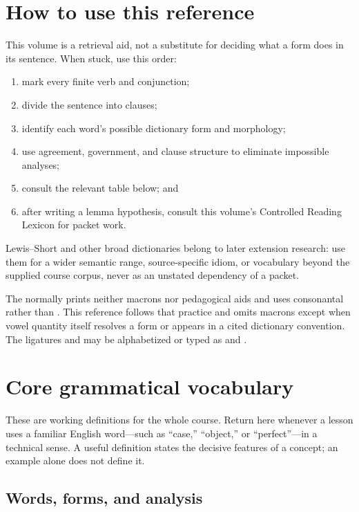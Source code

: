 \chapter{How to use this reference}

This volume is a retrieval aid, not a substitute for deciding what a form does
in its sentence. When stuck, use this order:

\begin{enumerate}
  \item mark every finite verb and conjunction;
  \item divide the sentence into clauses;
  \item identify each word's possible dictionary form and morphology;
  \item use agreement, government, and clause structure to eliminate
        impossible analyses;
  \item consult the relevant table below; and
  \item after writing a lemma hypothesis, consult this volume's Controlled
        Reading Lexicon for packet work.
\end{enumerate}

Lewis--Short and other broad dictionaries belong to later extension research:
use them for a wider semantic range, source-specific idiom, or vocabulary
beyond the supplied course corpus, never as an unstated dependency of a
packet.

The \Missal{} normally prints neither macrons nor pedagogical aids and uses
consonantal  rather than . This reference follows that
practice and omits macrons except when vowel quantity itself resolves a form
or appears in a cited dictionary convention. The ligatures  and
 may be alphabetized or typed as  and .

\chapter{Core grammatical vocabulary}

These are working definitions for the whole course. Return here whenever a
lesson uses a familiar English word---such as ``case,'' ``object,'' or
``perfect''---in a technical sense. A useful definition states the decisive
features of a concept; an example alone does not define it.

\section{Words, forms, and analysis}

